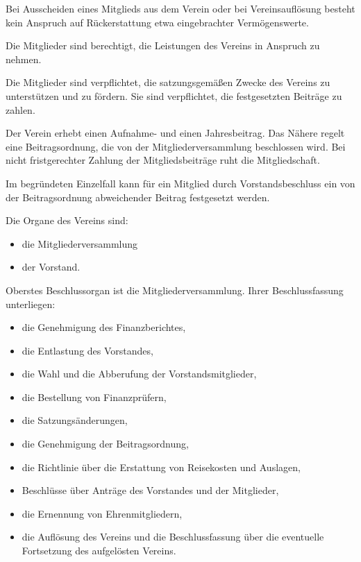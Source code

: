 \documentclass[12pt,ngerman]{scrartcl}
\begin{document}
\begin{contract}
Bei Ausscheiden eines Mitglieds aus dem Verein oder bei Vereinsauflösung besteht kein Anspruch auf Rückerstattung etwa eingebrachter Vermögenswerte.


Die Mitglieder sind berechtigt, die Leistungen des Vereins in Anspruch zu nehmen.

Die Mitglieder sind verpflichtet, die satzungsgemäßen Zwecke des Vereins zu unterstützen und zu fördern. Sie sind verpflichtet, die festgesetzten Beiträge zu zahlen.


Der Verein erhebt einen Aufnahme- und einen Jahresbeitrag. Das Nähere regelt eine Beitragsordnung, die von der Mitgliederversammlung beschlossen wird. Bei nicht fristgerechter Zahlung der Mitgliedsbeiträge ruht die Mitgliedschaft.

Im begründeten Einzelfall kann für ein Mitglied durch Vorstandsbeschluss ein von der Beitragsordnung abweichender Beitrag festgesetzt werden.


Die Organe des Vereins sind:

\begin{itemize}
	\item die Mitgliederversammlung
	\item der Vorstand.
\end{itemize}




Oberstes Beschlussorgan ist die Mitgliederversammlung. Ihrer Beschlussfassung unterliegen:

\begin{itemize}
	\item die Genehmigung des Finanzberichtes,
	\item  die Entlastung des Vorstandes,
	\item die Wahl und die Abberufung der Vorstandsmitglieder,
	\item die Bestellung von Finanzprüfern,
	\item die Satzungsänderungen,
	\item die Genehmigung der Beitragsordnung,
	\item die Richtlinie über die Erstattung von Reisekosten und Auslagen,
	\item Beschlüsse über Anträge des Vorstandes und der Mitglieder,
	\item die Ernennung von Ehrenmitgliedern,
	\item die Auflösung des Vereins und die Beschlussfassung über die eventuelle Fortsetzung des aufgelösten Vereins.
\end{itemize}


\end{contract}
\end{document}
